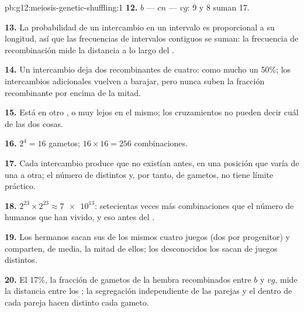 \begin{solution}{pb:g12:meiosis-genetic-shuffling:1}
\textbf{12.} $b$ --- $cn$ --- $vg$: 9 y 8 suman 17.

\textbf{13.} La probabilidad de un intercambio en un intervalo es
proporcional a su longitud, así que las frecuencias de intervalos
contiguos se suman: la frecuencia de recombinación mide la distancia a
lo largo del .

\textbf{14.} Un intercambio deja dos  recombinantes de cuatro:
como mucho un 50\%; los intercambios adicionales vuelven a barajar,
pero nunca suben la fracción recombinante por encima de la mitad.

\textbf{15.} Está en otro , o muy lejos en el mismo; los
cruzamientos no pueden decir cuál de las dos cosas.

\textbf{16.} $2^4 = 16$ gametos; $16 \times 16 = 256$ combinaciones.

\textbf{17.} Cada intercambio produce  que no existían antes,
en una posición que varía de una  a otra; el número de
 distintos y, por tanto, de gametos, no tiene límite
práctico.

\textbf{18.} $2^{23} \times 2^{23} \approx \num{7e13}$: setecientas
veces más combinaciones que el número de humanos que han vivido, y eso
antes del .

\textbf{19.} Los hermanos sacan sus  de los mismos cuatro juegos
(dos por progenitor) y comparten, de media, la mitad de ellos; los
desconocidos los sacan de juegos distintos.

\textbf{20.} El 17\%, la fracción de gametos de la hembra recombinados
entre $b$ y $vg$, mide la distancia entre los ; la segregación
independiente de las parejas y el  dentro de cada
pareja hacen distinto cada gameto.
\end{solution}
